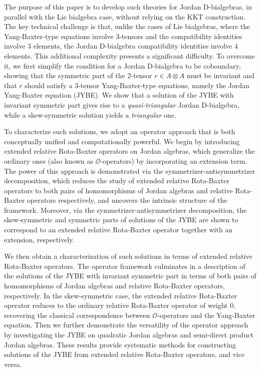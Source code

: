 \documentclass[12pt, reqno, a4paper]{amsart}
\theoremstyle{definition}
\begin{document}
The purpose of this paper is to develop such theories for Jordan D-bialgebras, in parallel with the Lie bialgebra case, without relying on the KKT construction.
The key technical challenge is that, unlike the cases of Lie bialgebras, where the Yang-Baxter-type equations involve 3-tensors and the compatibility identities involve 3 elements, the Jordan D-bialgebra compatibility identities involve 4 elements.
This additional complexity presents a significant difficulty.
To overcome it, we first simplify the condition for a Jordan D-bialgebra to be coboundary, showing that the symmetric part of the 2-tensor $r \in A \otimes A$ must be invariant and that $r$ should satisfy a 3-tensor Yang-Baxter-type equations, namely the Jordan Yang-Baxter equation (JYBE).
We show that a solution of the JYBE with invariant symmetric part gives rise to a \emph{quasi-triangular} Jordan D-bialgebra, while a skew-symmetric solution yields a \emph{triangular} one.  



To characterize such solutions, we adopt an operator approach that is both conceptually unified and computationally powerful.
We begin by introducing extended relative Rota-Baxter operators on Jordan algebras, which generalize the ordinary ones (also known as $\mathcal{O}$-operators) by incorporating an extension term.
The power of this approach is demonstrated via the symmetrizer-antisymmetrizer decomposition, which reduces the study of extended relative Rota-Baxter operators to both pairs of homomorphisms of Jordan algebras and relative Rota-Baxter operators respectively, and uncovers the intrinsic structure of the framework.
Moreover, via the symmetrizer-antisymmetrizer decomposition, the skew-symmetric and symmetric parts of solutions of the JYBE are shown to correspond to an extended relative Rota-Baxter operator together with an extension, respectively.

We then obtain a characterization of such solutions in terms of extended relative Rota-Baxter operators. 
The operator framework culminates in a description of the solutions of the JYBE with invariant symmetric part in terms of both pairs of homomorphisms of Jordan algebras and relative Rota-Baxter operators, respectively.
In the skew-symmetric case, the extended relative Rota-Baxter operator reduces to the ordinary relative Rota-Baxter operator of weight $0$, recovering the classical correspondence between $\mathcal{O}$-operators and the Yang-Baxter equation. Then we further demonstrate the versatility of the operator approach by investigating the JYBE on quadratic Jordan algebras and semi-direct product Jordan algebras.
These results provide systematic methods for constructing solutions of the JYBE from extended relative Rota-Baxter operators, and vice versa.
\end{document}
